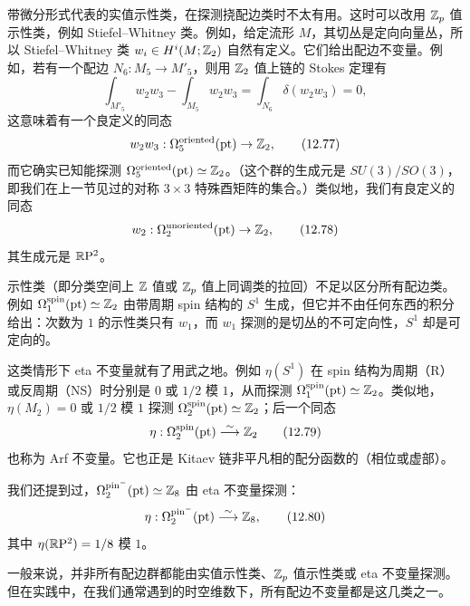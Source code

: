 带微分形式代表的实值示性类，在探测挠配边类时不太有用。这时可以改用 $\mathbb{Z}_p$ 值示性类，例如 Stiefel--Whitney 类。例如，给定流形 $M$，其切丛是定向向量丛，所以 Stiefel--Whitney 类 $w_i\in H^i(M;\mathbb{Z}_2)$ 自然有定义。它们给出配边不变量。例如，若有一个配边 $N_6:M_5\to M'_5$，则用 $\mathbb{Z}_2$ 值上链的 Stokes 定理有
\begin{equation}
  \int_{M'_5}w_2w_3-\int_{M_5}w_2w_3
  =\int_{N_6}\delta(w_2w_3)=0,
  \tag{12.76}
\end{equation}
这意味着有一个良定义的同态
\begin{equation}
  w_2w_3:\Omega^{\mathrm{oriented}}_5(\mathrm{pt})\to\mathbb{Z}_2,
  \tag{12.77}
\end{equation}
而它确实已知能探测 $\Omega^{\mathrm{oriented}}_5(\mathrm{pt})\simeq\mathbb{Z}_2$。（这个群的生成元是 $SU(3)/SO(3)$，即我们在上一节见过的对称 $3\times3$ 特殊酉矩阵的集合。）类似地，我们有良定义的同态
\begin{equation}
  w_2:\Omega^{\mathrm{unoriented}}_2(\mathrm{pt})\to\mathbb{Z}_2,
  \tag{12.78}
\end{equation}
其生成元是 $\mathbb{R}\mathrm{P}^2$。

示性类（即分类空间上 $\mathbb{Z}$ 值或 $\mathbb{Z}_p$ 值上同调类的拉回）不足以区分所有配边类。例如 $\Omega^{\mathrm{spin}}_1(\mathrm{pt})\simeq\mathbb{Z}_2$ 由带周期 spin 结构的 $S^1$ 生成，但它并不由任何东西的积分给出：次数为 $1$ 的示性类只有 $w_1$，而 $w_1$ 探测的是切丛的不可定向性，$S^1$ 却是可定向的。

这类情形下 eta 不变量就有了用武之地。例如 $\eta(S^1)$ 在 spin 结构为周期（R）或反周期（NS）时分别是 $0$ 或 $1/2$ 模 $1$，从而探测 $\Omega^{\mathrm{spin}}_1(\mathrm{pt})\simeq\mathbb{Z}_2$。类似地，$\eta(M_2)=0$ 或 $1/2$ 模 $1$ 探测 $\Omega^{\mathrm{spin}}_2(\mathrm{pt})\simeq\mathbb{Z}_2$；后一个同态
\begin{equation}
  \eta:\Omega^{\mathrm{spin}}_2(\mathrm{pt})\overset{\sim}{\longrightarrow}\mathbb{Z}_2
  \tag{12.79}
\end{equation}
也称为 Arf 不变量。它也正是 Kitaev 链非平凡相的配分函数的（相位或虚部）。

我们还提到过，$\Omega^{\mathrm{pin}^-}_2(\mathrm{pt})\simeq\mathbb{Z}_8$ 由 eta 不变量探测：
\begin{equation}
  \eta:\Omega^{\mathrm{pin}^-}_2(\mathrm{pt})\overset{\sim}{\longrightarrow}\mathbb{Z}_8,
  \tag{12.80}
\end{equation}
其中 $\eta(\mathbb{R}\mathrm{P}^2)=1/8$ 模 $1$。

一般来说，并非所有配边群都能由实值示性类、$\mathbb{Z}_p$ 值示性类或 eta 不变量探测。但在实践中，在我们通常遇到的时空维数下，所有配边不变量都是这几类之一。

